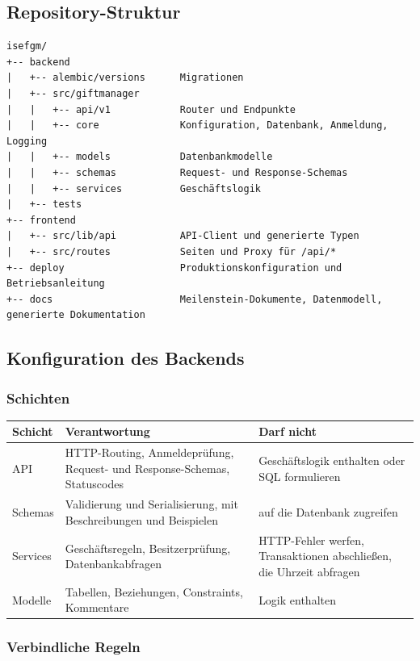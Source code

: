 \documentclass[11pt,a4paper]{article}
\renewcommand{\footnotesize}{\fontsize{10}{12}\selectfont}
\begin{document}
\subsection{Repository-Struktur}

{\footnotesize
\begin{verbatim}
isefgm/
+-- backend
|   +-- alembic/versions      Migrationen
|   +-- src/giftmanager
|   |   +-- api/v1            Router und Endpunkte
|   |   +-- core              Konfiguration, Datenbank, Anmeldung, Logging
|   |   +-- models            Datenbankmodelle
|   |   +-- schemas           Request- und Response-Schemas
|   |   +-- services          Geschäftslogik
|   +-- tests
+-- frontend
|   +-- src/lib/api           API-Client und generierte Typen
|   +-- src/routes            Seiten und Proxy für /api/*
+-- deploy                    Produktionskonfiguration und Betriebsanleitung
+-- docs                      Meilenstein-Dokumente, Datenmodell, generierte Dokumentation
\end{verbatim}
}

\subsection{Konfiguration des Backends}

\subsubsection{Schichten}

\begin{tabularx}{\linewidth}{@{}l >{\hsize=1.10\hsize\RaggedRight\arraybackslash}X >{\hsize=0.90\hsize\RaggedRight\arraybackslash}X@{}}
\toprule
\textbf{Schicht} & \textbf{Verantwortung} & \textbf{Darf nicht} \\
\midrule
\endhead
API & HTTP-Routing, Anmeldeprüfung, Request- und Response-Schemas, Statuscodes & Geschäftslogik enthalten oder SQL formulieren \\
Schemas & Validierung und Serialisierung, mit Beschreibungen und Beispielen & auf die Datenbank zugreifen \\
Services & Geschäftsregeln, Besitzerprüfung, Datenbankabfragen & HTTP-Fehler werfen, Transaktionen abschließen, die Uhrzeit abfragen \\
Modelle & Tabellen, Beziehungen, Constraints, Kommentare & Logik enthalten \\
\bottomrule
\end{tabularx}

\subsubsection{Verbindliche Regeln}
\end{document}
